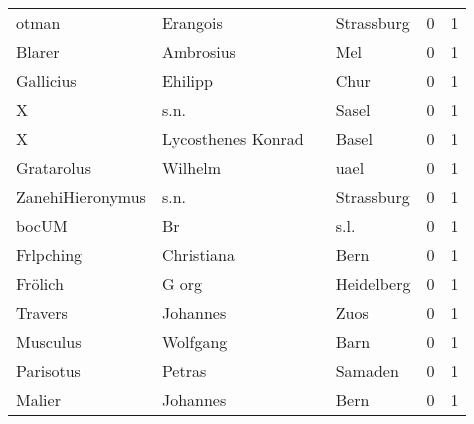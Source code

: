\begin{tabular}{llllrr}
                    otman &                           Erangois &             &                                  Strassburg &          0 &         1 \\
                   Blarer &                          Ambrosius &             &                                         Mel &          0 &         1 \\
                Gallicius &                            Ehilipp &             &                                        Chur &          0 &         1 \\
                        X &                               s.n. &             &                                       Sasel &          0 &         1 \\
                        X &                 Lycosthenes Konrad &             &                                       Basel &          0 &         1 \\
               Gratarolus &                            Wilhelm &             &                                        uael &          0 &         1 \\
         ZanehiHieronymus &                               s.n. &             &                                  Strassburg &          0 &         1 \\
                    bocUM &                                 Br &             &                                        s.l. &          0 &         1 \\
                Frlpching &                         Christiana &             &                                        Bern &          0 &         1 \\
                  Frölich &                              G org &             &                                  Heidelberg &          0 &         1 \\
                  Travers &                           Johannes &             &                                        Zuos &          0 &         1 \\
                 Musculus &                           Wolfgang &             &                                        Barn &          0 &         1 \\
                Parisotus &                             Petras &             &                                     Samaden &          0 &         1 \\
                   Malier &                           Johannes &             &                                        Bern &          0 &         1 \\

\end{tabular}

